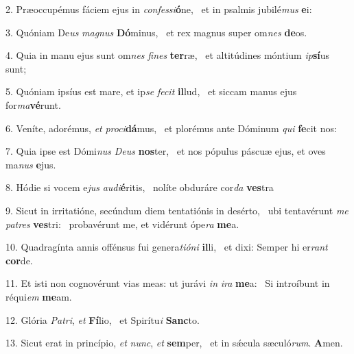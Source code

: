 2. Præoccupémus fáciem ejus in \textit{con}\textit{fes}\textit{si}\textbf{ó}ne, \ast\  et in psalmis jubilé\textit{mus} \textbf{e}i:\

3. Quóniam De\textit{us} \textit{ma}\textit{gnus} \textbf{Dó}minus, \ast\  et rex magnus super om\textit{nes} \textbf{de}os.\

4. Quia in manu ejus sunt om\textit{nes} \textit{fi}\textit{nes} \textbf{ter}ræ, \ast\  et altitúdines móntium \textit{ip}\textbf{sí}us sunt;\

5. Quóniam ipsíus est mare, et ip\textit{se} \textit{fe}\textit{cit} \textbf{il}lud, \ast\  et siccam manus ejus for\textit{ma}\textbf{vé}runt.\

6. Veníte, adorémus, \textit{et} \textit{pro}\textit{ci}\textbf{dá}mus, \ast\  et plorémus ante Dóminum \textit{qui} \textbf{fe}cit nos:\

7. Quia ipse est Dómi\textit{nus} \textit{De}\textit{us} \textbf{nos}ter, \ast\  et nos pópulus páscuæ ejus, et oves ma\textit{nus} \textbf{e}jus.\

8. Hódie si vocem e\textit{jus} \textit{au}\textit{di}\textbf{é}ritis, \ast\  nolíte obduráre cor\textit{da} \textbf{ves}tra\

9. Sicut in irritatióne, secúndum diem tentatiónis in desérto, \dag\  ubi tentavérunt \textit{me} \textit{pa}\textit{tres} \textbf{ves}tri: \ast\  probavérunt me, et vidérunt ópe\textit{ra} \textbf{me}a.\

10. Quadragínta annis offénsus fui genera\textit{ti}\textit{ó}\textit{ni} \textbf{il}li, \ast\  et dixi: Semper hi er\textit{rant} \textbf{cor}de.\

11. Et isti non cognovérunt vias meas: ut jurávi \textit{in} \textit{i}\textit{ra} \textbf{me}a: \ast\  Si introíbunt in réqui\textit{em} \textbf{me}am.\

12. Glória \textit{Pa}\textit{tri}, \textit{et} \textbf{Fí}lio, \ast\  et Spirítu\textit{i} \textbf{Sanc}to.\

13. Sicut erat in princípio, \textit{et} \textit{nunc}, \textit{et} \textbf{sem}per, \ast\  et in sǽcula sæculó\textit{rum}. \textbf{A}men.\

